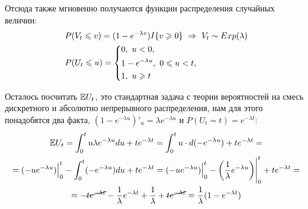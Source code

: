 \begin{solution}
    Отсюда также мгновенно получаются функции распределения случайных величин:
    \begin{align*}
        & P(V_t \le v) = (1 - e^{-\lambda v}) I\{v \ge 0\} \ \Ra \ V_t \sim Exp(\lambda)
        \\
        & P(U_t \le u) = \System{
            & 0,\ u < 0,
            \\
            & 1 - e^{-\lambda u},\ 0 \le u < t,
            \\
            & 1,\ u \ge t
        }
    \end{align*}

    Осталось посчитать $\mathbb{E} U_t$, это стандартная задача с теории вероятностей на смесь дискретного и абсолютно непрерывного распределения, нам для этого понадобятся два факта, $(1 - e^{-\lambda u})'_u = \lambda e^{-\lambda u}$ и $P(U_t = t) = e^{-\lambda t}$:
    \begin{multline*}
        \mathbb{E} U_t = \int_0^t u \lambda e^{-\lambda u} du + t e^{-\lambda t} = \int_0^t u \cdot d(-e^{-\lambda u}) + t e^{-\lambda t} =
        \\
        = (-u e^{-\lambda u}) \Bigr|_0^t - \int_0^t (-e^{-\lambda u}) du + t e^{-\lambda t} = (-u e^{-\lambda u}) \Bigr|_0^t - \left(\frac{1}{\lambda} e^{-\lambda u}\right) \Biggr|_0^t + t e^{-\lambda t} =
        \\
        = - \cancel{t e^{-\lambda t}} - \frac{1}{\lambda} e^{-\lambda t} + \frac{1}{\lambda} + \cancel{t e^{-\lambda t}} = \frac{1}{\lambda} (1 - e^{-\lambda t})
    \end{multline*}
\end{solution}